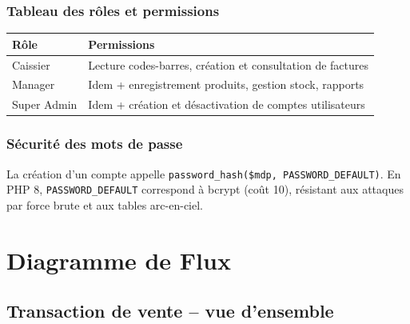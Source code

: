 \documentclass[12pt,a4paper]{report}
\begin{document}
\subsection{Tableau des rôles et permissions}

\begin{center}
\begin{tabular}{L{2.5cm} L{9cm}}
  \toprule
  \textbf{Rôle} & \textbf{Permissions} \\
  \midrule
  Caissier  & Lecture codes-barres, création et consultation de factures \\
  Manager   & Idem + enregistrement produits, gestion stock, rapports \\
  Super Admin & Idem + création et désactivation de comptes utilisateurs \\
  \bottomrule
\end{tabular}
\end{center}

\subsection{Sécurité des mots de passe}
La création d'un compte appelle \texttt{password\_hash(\$mdp, PASSWORD\_DEFAULT)}.
En PHP 8, \texttt{PASSWORD\_DEFAULT} correspond à bcrypt (coût 10), résistant aux
attaques par force brute et aux tables arc-en-ciel.

\chapter{Diagramme de Flux}

\section{Transaction de vente -- vue d'ensemble}
\end{document}
